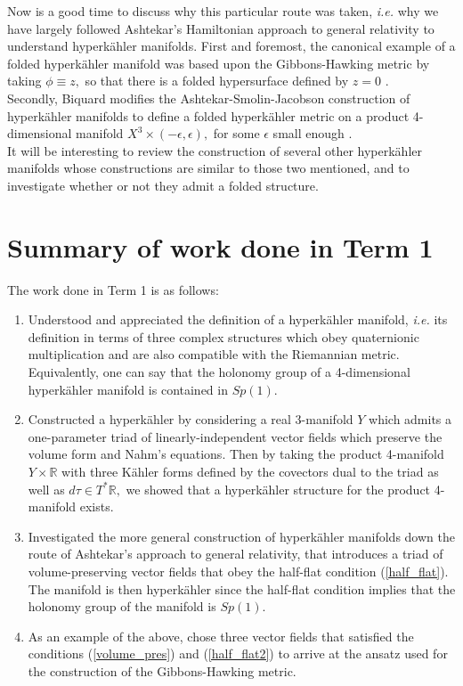 \documentclass[a4paper,onecolumn,12pt]{article}
\theoremstyle{definition}
\theoremstyle{remark}
\newcommand{\ie}{\emph{i.e.} }
\newcommand{\e}{\epsilon}
\newcommand{\K}{K\"ahler }
\newcommand{\HK}{hyperk\"ahler }
\newcommand{\R}{\mathbb{R}}
\begin{document}
Now is a good time to discuss why this particular route was taken, \ie why we have largely followed Ashtekar's Hamiltonian approach to general relativity to understand \HK manifolds. First and foremost, the canonical example of a folded \HK manifold was based upon the Gibbons-Hawking metric by taking $\phi\equiv z,$ so that there is a folded hypersurface defined by $z=0$ \cite{hitchin_2015}.\\
Secondly, Biquard modifies the Ashtekar-Smolin-Jacobson construction of \HK manifolds to define a folded \HK metric on a product 4-dimensional manifold $X^{3}\times(-\e,\e),$ for some $\e$ small enough \cite{biquard_2015}.\\
It will be interesting to review the construction of several other \HK manifolds whose constructions are similar to those two mentioned, and to investigate whether or not they admit a folded structure.

\section{Summary of work done in Term 1}
The work done in Term 1 is as follows:

\begin{enumerate}
	\item Understood and appreciated the definition of a \HK manifold, \ie its definition in terms of three complex structures which obey quaternionic multiplication and are also compatible with the Riemannian metric. Equivalently, one can say that the holonomy group of a 4-dimensional \HK manifold is contained in $Sp(1).$
	\item Constructed a \HK by considering a real 3-manifold $Y$ which admits a one-parameter triad of linearly-independent vector fields which preserve the volume form and Nahm's equations. Then by taking the product 4-manifold $Y\times\R$ with three \K forms defined by the covectors dual to the triad as well as $d\tau\in T^{*}\R,$ we showed that a \HK structure for the product 4-manifold exists.
	\item Investigated the more general construction of \HK manifolds down the route of Ashtekar's approach to general relativity, that introduces a triad of volume-preserving vector fields that obey the half-flat condition (\ref{half_flat}). The manifold is then \HK since the half-flat condition implies that the holonomy group of the manifold is $Sp(1).$
	\item As an example of the above, chose three vector fields that satisfied the conditions (\ref{volume_pres}) and (\ref{half_flat2}) to arrive at the ansatz used for the construction of the Gibbons-Hawking metric.
\end{enumerate}
\end{document}
